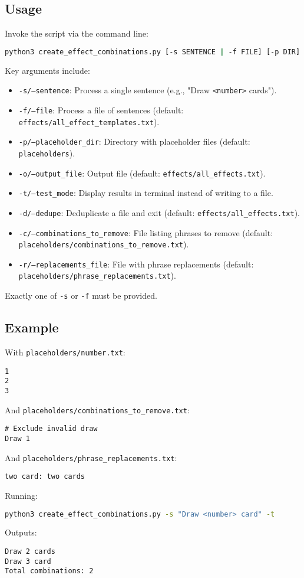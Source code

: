 \subsection{Usage}
Invoke the script via the command line:
\begin{lstlisting}[language=bash]
python3 create_effect_combinations.py [-s SENTENCE | -f FILE] [-p DIR] [-o OUT] [-t] [-d [FILE]] [-c CONFIG] [-r REPLACEMENTS]
\end{lstlisting}
Key arguments include:
\begin{itemize}
    \item \texttt{-s/--sentence}: Process a single sentence (e.g., "Draw \texttt{<number>} cards").
    \item \texttt{-f/--file}: Process a file of sentences (default: \texttt{effects/all\_effect\_templates.txt}).
    \item \texttt{-p/--placeholder\_dir}: Directory with placeholder files (default: \texttt{placeholders}).
    \item \texttt{-o/--output\_file}: Output file (default: \texttt{effects/all\_effects.txt}).
    \item \texttt{-t/--test\_mode}: Display results in terminal instead of writing to a file.
    \item \texttt{-d/--dedupe}: Deduplicate a file and exit (default: \texttt{effects/all\_effects.txt}).
    \item \texttt{-c/--combinations\_to\_remove}: File listing phrases to remove (default: \texttt{placeholders/combinations\_to\_remove.txt}).
    \item \texttt{-r/--replacements\_file}: File with phrase replacements (default: \texttt{placeholders/phrase\_replacements.txt}).
\end{itemize}
Exactly one of \texttt{-s} or \texttt{-f} must be provided.

\subsection{Example}
With \texttt{placeholders/number.txt}:
\begin{lstlisting}
1
2
3
\end{lstlisting}
And \texttt{placeholders/combinations\_to\_remove.txt}:
\begin{lstlisting}
# Exclude invalid draw
Draw 1
\end{lstlisting}
And \texttt{placeholders/phrase\_replacements.txt}:
\begin{lstlisting}
two card: two cards
\end{lstlisting}
Running:
\begin{lstlisting}[language=bash]
python3 create_effect_combinations.py -s "Draw <number> card" -t
\end{lstlisting}
Outputs:
\begin{lstlisting}
Draw 2 cards
Draw 3 card
Total combinations: 2
\end{lstlisting}

